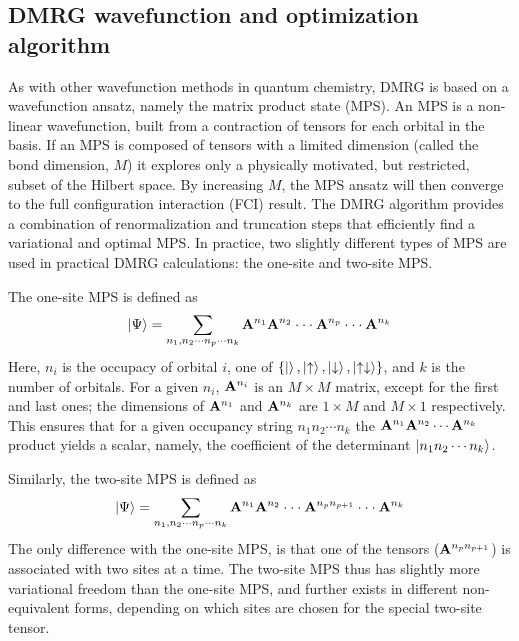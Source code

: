 
\subsection{DMRG wavefunction and optimization algorithm}

As with other wavefunction methods in quantum chemistry, DMRG is based on a wavefunction ansatz, namely the matrix product state (MPS).
An MPS is a non-linear wavefunction, built from a contraction of tensors for each orbital in the basis. If an MPS is
composed of tensors with a limited dimension (called the bond dimension, $M$) it explores only a physically motivated, but restricted, subset of the Hilbert space. 
By increasing $M$, the MPS ansatz will then converge to the full configuration interaction (FCI) result. The DMRG algorithm provides a combination of 
renormalization and truncation steps that efficiently find a variational and optimal MPS. 
In practice, two slightly different types of MPS are used in practical
DMRG calculations: the one-site and two-site MPS. 

The one-site MPS is defined as
\begin{equation}
  \ket{\Psi}= \sum_{\substack{n_1, n_2\cdot\cdot\cdot n_p\cdot\cdot\cdot n_k}} {\bf A}^{n_1}{\bf A}^{n_2}\cdot\cdot\cdot {\bf A}^{n_{p}} \cdot\cdot\cdot{\bf A}^{n_k}
\end{equation}
Here, $n_i$ is the occupacy of orbital $i$, one of $ \{\ket{}, \ket{\uparrow}, \ket{\downarrow}, \ket{\uparrow\downarrow}\}$, and $k$ is the number of orbitals. 
For a given $n_i$, ${\bf A}^{n_i}$ is  an $M\times M$ matrix, except for the first and last ones; the dimensions of ${\bf A}^{n_1}$ and ${\bf A}^{n_k}$ are $1\times M$ and $M\times 1$ respectively.
This ensures that for a given occupancy string $n_1n_2\cdots n_k$  the ${\bf A}^{n_1}{\bf A}^{n_2}\cdots{\bf A}^{n_k}$ product yields a scalar, 
namely, the coefficient of the determinant $\ket{n_1n_2\cdots n_k}$.

Similarly, the two-site MPS is defined as
\begin{equation}
  \ket{\Psi}= \sum_{\substack{n_1, n_2\cdot\cdot\cdot n_p\cdot\cdot\cdot n_k}} {\bf A}^{n_1}{\bf A}^{n_2}\cdot\cdot\cdot {\bf A}^{n_{p}n_{p+1}} \cdot\cdot\cdot{\bf A}^{n_k}
\end{equation}
The only difference with the one-site MPS, is that one of the tensors (${\bf A}^{n_p n_{p+1}}$) is associated with two sites at a time. The two-site MPS thus
has slightly more variational freedom than the one-site MPS, and further
exists in different non-equivalent forms, depending on which sites are chosen for the special two-site tensor.

